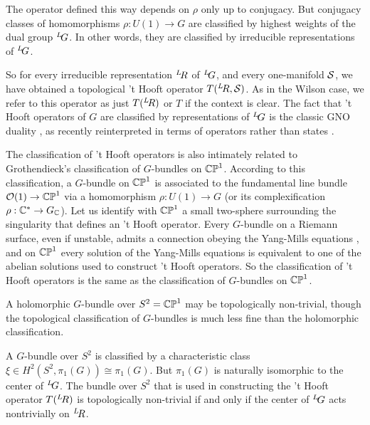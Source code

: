 The operator defined this way depends on $\rho$ only up to
conjugacy.  But conjugacy classes of homomorphisms $\rho:U(1)\to
G$ are classified by highest weights of the dual group
$^L\negthinspace G$.  In other words, they are classified by
irreducible representations of $^L\negthinspace G$.

So for every irreducible representation $^L\negthinspace R$ of
$^L\negthinspace G$, and every one-manifold ${{\cal S}}$, we have
obtained a topological 't Hooft operator $T({}^L\negthinspace
R,{{\cal S}})$. As in the Wilson case, we refer to this operator
as just $T({}^L\negthinspace R)$ or $T$ if the context is clear.
The fact that 't Hooft operators of $G$ are classified by
representations of $^L\negthinspace G$ is the classic GNO duality
\cite{ref10}, as recently reinterpreted in terms of operators rather than
states \cite{ref90}.

The classification of 't Hooft operators is also intimately
related to Grothendieck's classification of $G$-bundles on ${\Bbb
{CP}}^1$.  According to this classification, a $G$-bundle on
${\Bbb {CP}}^1$ is associated to the fundamental line bundle
${\cal O}(1)\to\Bbb{CP}^1$ via a homomorphism $\rho:U(1)\to G$ (or
its complexification $\rho:\Bbb{C}^*\to G_{\Bbb{C}}$).  Let us
identify with $\Bbb{CP}^1$ a small two-sphere surrounding the
singularity that defines an 't Hooft operator. Every $G$-bundle on
a Riemann surface, even if unstable, admits a connection obeying
the Yang-Mills equations \cite{ref91}, and on $\Bbb{CP}^1$ every
solution of the Yang-Mills equations is equivalent to one of the
abelian solutions used to construct 't Hooft operators.  So the
classification of 't Hooft operators is the same as the
classification of $G$-bundles on $\Bbb{CP}^1$.

\par{}

A holomorphic $G$-bundle over $S^2=\Bbb{CP}^1$ may be
topologically non-trivial, though the topological classification
of $G$-bundles is much less fine than the holomorphic
classification.

A $G$-bundle over $S^2$ is classified by a characteristic class
$\xi\in H^2(S^2,\pi_1(G))\cong \pi_1(G)$.  But $\pi_1(G)$ is
naturally isomorphic to the center of $^L\negthinspace G$.  The
bundle over $S^2$ that is used in constructing the 't Hooft
operator $T(^L\negthinspace R)$ is topologically non-trivial if
and only if the center of $^L\negthinspace G$ acts nontrivially on
$^L\negthinspace R$.

